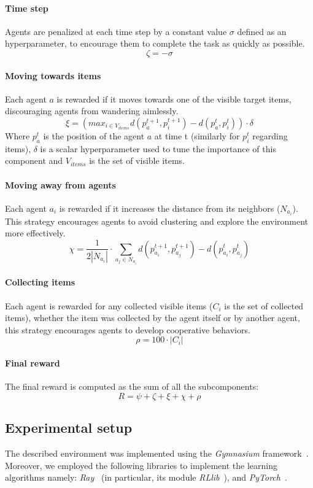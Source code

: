 \documentclass[sigconf]{acmart}
\begin{document}
\paragraph{Time step} Agents are penalized at each time step by a constant value $\sigma$ defined as
    an hyperparameter, to encourage them to complete the task as quickly as possible.
    \[ \zeta = - \sigma \]
 
\paragraph{Moving towards items} Each agent $a$ is rewarded if it moves towards one of the visible target items, discouraging agents from wandering aimlessly.
    \[ \xi = (max_{i \in V_{items}} d(p_a^{t+1}, p_i^{t+1}) - d(p_a^{t}, p_i^{t})) \cdot \delta\]
    Where $p_a^t$ is the position of the agent $a$ at time t (similarly for $p_i^{t}$ regarding items),
    $\delta$ is a scalar hyperparameter used to tune the importance of this component and
    $V_{items}$ is the set of visible items.
\paragraph{Moving away from agents} Each agent $a_i$ is rewarded if it increases the distance from its neighbors ($N_{a_i}$). This strategy encourages agents to avoid clustering and explore the environment more effectively.
    \[ \chi = \frac{1}{2|N_{a_i}|} \cdot \sum_{a_j \in N_{a_i}} d(p_{a_i}^{t+1}, p_{a_j}^{t+1}) - d(p_{a_i}^{t}, p_{a_j}^{t}) \]

\paragraph{Collecting items} Each agent is rewarded for any collected visible items ($C_i$ is the set of collected items), 
    whether the item was collected by  the agent itself or by another agent, this strategy encourages agents 
    to develop cooperative behaviors.
    \[ \rho = 100 \cdot |C_i| \]

\paragraph{Final reward} The final reward is computed as the sum of all the subcomponents:
  \[ R = \psi + \zeta + \xi + \chi + \rho \]
  
\subsection{Experimental setup}
The described environment was implemented using the \emph{Gymnasium} framework~\cite{DBLP:journals/corr/abs-2407-17032}.
Moreover, we employed the following libraries to implement the learning algorithms namely: \emph{Ray}~\cite{DBLP:conf/osdi/MoritzNWTLLEYPJ18} 
  (in particular, its module \emph{RLlib}~\cite{DBLP:conf/icml/LiangLNMFGGJS18}),
  and \emph{PyTorch}~\cite{DBLP:conf/nips/PaszkeGMLBCKLGA19}.
\end{document}
